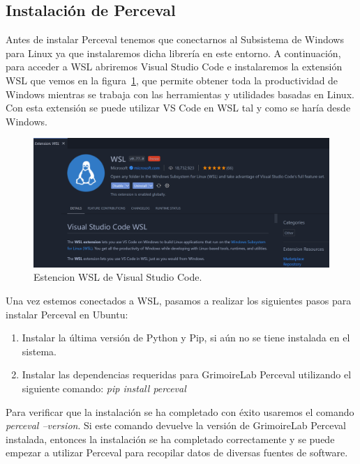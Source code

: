 \documentclass[a4paper, 12pt]{book}
\begin{document}
\subsection{Instalación de Perceval} %
\label{sec:instalación de perceval}

Antes de instalar Perceval tenemos que conectarnos al Subsistema de Windows para Linux ya que instalaremos dicha librería en este entorno.
A continuación, para acceder a WSL abriremos Visual Studio Code e instalaremos la extensión WSL que vemos en la figura~\ref{fig:extensionwsl}, que permite obtener toda la productividad de Windows mientras se trabaja con las herramientas y utilidades basadas en Linux.
Con esta extensión se puede utilizar VS Code en WSL tal y como se haría desde Windows.

\begin{figure}
  \centering
  \includegraphics[width=14cm, keepaspectratio]{img/extension_wsl.PNG}
  \caption{Estencion WSL de Visual Studio Code.}\label{fig:extensionwsl}
\end{figure}

Una vez estemos conectados a WSL, pasamos a realizar los siguientes pasos para instalar Perceval en Ubuntu:
\begin{enumerate}
  \item Instalar la última versión de Python y Pip, si aún no se tiene instalada en el sistema.
  \item Instalar las dependencias requeridas para GrimoireLab Perceval utilizando el siguiente comando: \emph{pip install perceval}
\end{enumerate}

Para verificar que la instalación se ha completado con éxito usaremos el comando \emph{perceval --version}. 
Si este comando devuelve la versión de GrimoireLab Perceval instalada, entonces la instalación se ha completado correctamente y se puede empezar a utilizar Perceval para recopilar datos de diversas fuentes de software.
\end{document}
